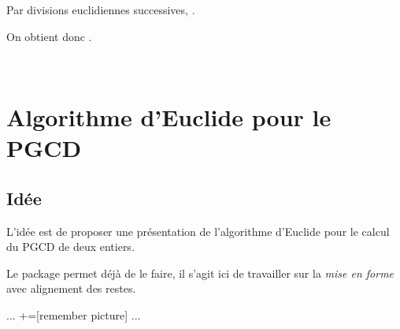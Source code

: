\documentclass{article}
\newcommand\ctex[1]{\tcbox[vignettelatex]{#1}}
\begin{document}
\begin{codesortie}

\medskip

Par divisions euclidiennes successives, .

\medskip


\medskip

On obtient donc .

\vspace{1.5cm}

~
\end{codesortie}

\newpage

\section{Algorithme d'Euclide pour le PGCD}\label{prespgcd}

\subsection{Idée}

\begin{codeidee}
L'idée est de proposer une \og présentation \fg{} de l'algorithme d'Euclide pour le calcul du PGCD de deux entiers.

Le package \ctex{xintgcd} permet déjà de le faire, il s'agit ici de travailler sur la \textit{mise en forme} avec alignement des restes.
\end{codeidee}

\begin{codetex}
\end{codetex}

\begin{codetex}
...
+=[remember picture]
...
\end{codetex}

\begin{codesortie}
\end{codesortie}
\end{document}
